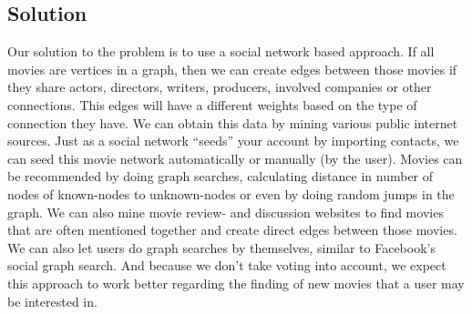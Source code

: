 \subsection{Solution}
\label{sec:intro:solution}
Our solution to the problem is to use a social network based approach. If all movies are vertices in a graph, then we
can create edges between those movies if they share actors, directors, writers, producers, involved companies or other
connections. This edges will have a different weights based on the type of connection they have. We can obtain this
data by mining various public internet sources. Just as a social network “seeds” your account by importing contacts,
we can seed this movie network automatically or manually (by the user). Movies can be recommended by doing graph
searches, calculating distance in number of nodes of known-nodes to unknown-nodes or even by doing random jumps
in the graph. We can also mine movie review- and discussion websites to find movies that are often mentioned
together and create direct edges between those movies. We can also let users do graph searches by themselves, similar
to Facebook’s social graph search. And because we don’t take voting into account, we expect this approach to work
better regarding the finding of new movies that a user may be interested in.